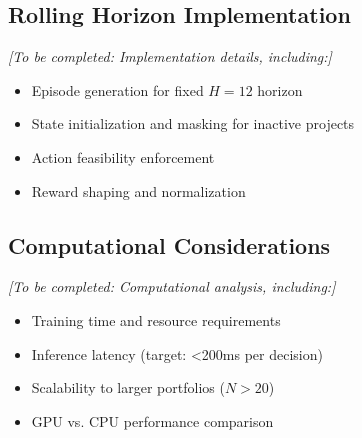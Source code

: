 \subsection{Rolling Horizon Implementation}

\textit{[To be completed: Implementation details, including:]}
\begin{itemize}
    \item Episode generation for fixed $H=12$ horizon
    \item State initialization and masking for inactive projects
    \item Action feasibility enforcement
    \item Reward shaping and normalization
\end{itemize}

\subsection{Computational Considerations}

\textit{[To be completed: Computational analysis, including:]}
\begin{itemize}
    \item Training time and resource requirements
    \item Inference latency (target: <200ms per decision)
    \item Scalability to larger portfolios ($N > 20$)
    \item GPU vs. CPU performance comparison
\end{itemize}
